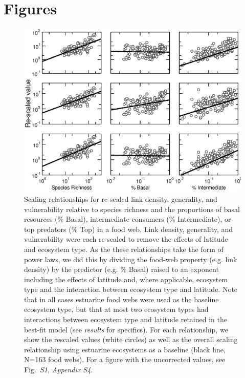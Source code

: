 \documentclass[12pt]{article}
\begin{document}
\newpage

\newpage

\section*{Figures}
\begin{figure}[h]
\centerline{\includegraphics*[width=.85\textwidth]{Figures/by_TL/scaling_with_S/proportions/fitlines_nonts.eps}}
\caption{Scaling relationships for re-scaled link density, generality, and vulnerability 
relative to species richness and the proportions of basal resources (\% Basal), intermediate 
consumers (\% Intermediate), or top predators (\% Top) in a food web. Link density, generality,
and vulnerability were each re-scaled to remove the effects of latitude and ecosystem
type. As the these relationships take the form of power laws, we did this by dividing the food-web
property (e.g. link density) by the predictor (e.g. \% Basal) raised to an exponent including the 
effects of latitude and, where applicable, ecosystem type and the interaction between ecosystem
type and latitude. Note that in all cases estuarine food webs were used as the baseline 
ecosystem type, but that at most two ecosystem types had interactions between ecosystem type and
latitude retained in the best-fit model (see \emph{results} for specifics). For each relationship, 
we show the rescaled values (white circles) as well as the overall scaling relationship using estuarine
ecosystems as a baseline (black line, N=163 food webs). For a figure with the uncorrected values,
see Fig.~\emph{S1}, \emph{Appendix S4}.}
\label{props_v_lat}
\end{figure}
\end{document}
